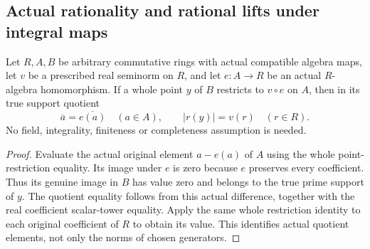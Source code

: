 \subsection{Actual rationality and rational lifts under integral maps}
\label{subsec:integral-rational-points}

\begin{theorem}
\label{spectrum:rational-support-coefficient-factor}
\leanok
{}
Let $R,A,B$ be arbitrary commutative rings with actual compatible algebra
maps, let $v$ be a prescribed real seminorm on $R$, and let
$e:A\to R$ be an actual $R$-algebra homomorphism. If a whole point $y$ of
$B$ restricts to $v\circ e$ on $A$, then in its true support quotient
\[
 \overline{a}=\overline{e(a)}\quad(a\in A),
 \qquad |r(y)|=v(r)\quad(r\in R).
\]
No field, integrality, finiteness or completeness assumption is needed.
\end{theorem}
\begin{proof}
Evaluate the actual original element $a-e(a)$ of $A$ using the whole
point-restriction equality. Its image under $e$ is zero because $e$
preserves every coefficient. Thus its genuine image in $B$ has value
zero and belongs to the true prime support of $y$. The quotient equality
follows from this actual difference, together with the real coefficient
scalar-tower equality. Apply the same whole restriction identity to each
original coefficient of $R$ to obtain its value. This identifies actual
quotient elements, not only the norms of chosen generators.
\end{proof}

